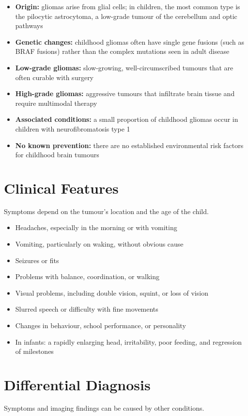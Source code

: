 \begin{itemize}
    \item \textbf{Origin:} gliomas arise from glial cells; in children, the most common type is the pilocytic astrocytoma, a low-grade tumour of the cerebellum and optic pathways
    \item \textbf{Genetic changes:} childhood gliomas often have single gene fusions (such as BRAF fusions) rather than the complex mutations seen in adult disease
    \item \textbf{Low-grade gliomas:} slow-growing, well-circumscribed tumours that are often curable with surgery
    \item \textbf{High-grade gliomas:} aggressive tumours that infiltrate brain tissue and require multimodal therapy
    \item \textbf{Associated conditions:} a small proportion of childhood gliomas occur in children with neurofibromatosis type 1
    \item \textbf{No known prevention:} there are no established environmental risk factors for childhood brain tumours
\end{itemize}

\section*{Clinical Features}
Symptoms depend on the tumour's location and the age of the child.

\begin{itemize}
    \item Headaches, especially in the morning or with vomiting
    \item Vomiting, particularly on waking, without obvious cause
    \item Seizures or fits
    \item Problems with balance, coordination, or walking
    \item Visual problems, including double vision, squint, or loss of vision
    \item Slurred speech or difficulty with fine movements
    \item Changes in behaviour, school performance, or personality
    \item In infants: a rapidly enlarging head, irritability, poor feeding, and regression of milestones
\end{itemize}

\section*{Differential Diagnosis}
Symptoms and imaging findings can be caused by other conditions.

